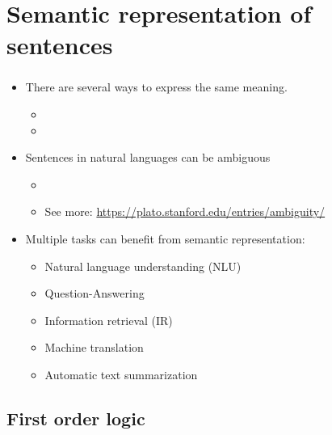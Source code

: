 \documentclass[xcolor=table]{beamer}
\begin{document}
\section{Semantic representation of sentences}

\begin{frame}
	\frametitle{\insertshortsubtitle}
	\framesubtitle{\insertsection}
	
	\begin{itemize}
		\item There are several ways to express the same meaning.
		\begin{itemize}
			\item {}
			\item {}
		\end{itemize}
	
		\item Sentences in natural languages can be ambiguous
		\begin{itemize}
			\item {}
			\item See more: \url{https://plato.stanford.edu/entries/ambiguity/}
		\end{itemize}
	
		\item Multiple tasks can benefit from semantic representation:
		\begin{itemize}
			\item Natural language understanding (NLU)
			\item Question-Answering
			\item Information retrieval (IR)
			\item Machine translation
			\item Automatic text summarization
		\end{itemize}
	\end{itemize}
	
\end{frame}

\subsection{First order logic}
\end{document}

